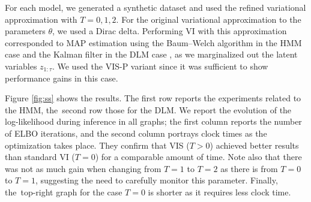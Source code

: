  For each model, we generated a synthetic dataset and used the refined variational approximation with $T = 0, 1, 2$. For the original variational approximation to the parameters $\theta$, we used a Dirac delta. Performing VI with this approximation corresponded to MAP estimation using 
 the Baum--Welch algorithm in the HMM case \parencite{rabiner1989tutorial} and
 the Kalman filter in the DLM case \parencite{zarchan2013fundamentals},
  as we marginalized out the latent variables $z_{1:\tau}$. We used the VIS-P variant since it was sufficient  to show performance gains in this case.%
 
 Figure \ref{fig:ss} shows the results. The first row reports the experiments related to the HMM, the~second row those for the DLM. We report the evolution of the log-likelihood during inference  in all graphs; the first column reports the number of ELBO iterations, and the second column portrays 
 clock times as the optimization takes place. They confirm that VIS ($T>0$) achieved better results than standard VI ($T=0$) for a comparable amount of time. {Note also  that there was not as much gain when changing from $T=1$ to $T=2$ as there is from $T=0$ to $T=1$, suggesting the need to carefully 
 monitor this parameter. Finally, the~top-right graph for the case $T=0$ is shorter as it requires less clock time.}
 


